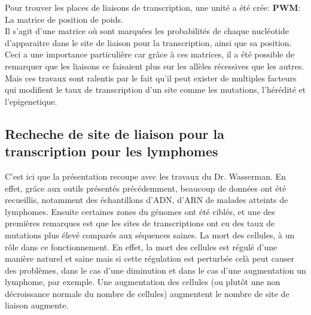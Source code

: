 Pour trouver les places de liaisons de transcription, une unité a été crée: \textbf{PWM}: La matrice de position de poids.\\
Il s'agit d'une matrice où sont marquées les probabilités de chaque nucléotide d'apparaitre dans le site de liaison pour la transcription, ainsi que sa position.
\newline
\newline
Ceci a une importance particulière car grâce à ces matrices, il a été possible de remarquer que les liaisons ce faisaient plus sur les allèles récessives que les autres.
\newline
Mais ces travaux sont ralentis par le fait qu'il peut exister de multiples facteurs qui modifient le taux de transcription d'un site comme les mutations, l'hérédité et l'epigenetique.
\subsection{Recheche de site de liaison pour la transcription pour les lymphomes}

C'est ici que la présentation recoupe avec les travaux du Dr. Wasserman.
\newline
En effet, grâce aux outils présentés précédemment, beaucoup de données ont été recueillis, notamment des échantillons d'ADN, d'ARN de malades atteints de lymphomes.
\newline
\newline
Ensuite certaines zones du génomes ont été ciblés, et une des premières remarques est que les sites de transcriptions ont eu des taux de mutations plus élevé comparés aux séquences saines.
\newline
\newline
La mort des cellules, à un rôle dans ce fonctionnement. En effet, la mort des cellules est régulé d'une manière naturel et saine mais si cette régulation est perturbée celà peut causer des problèmes, dans le cas d'une diminution et dans le cas d'une augmentation un lymphome, par exemple. Une augmentation des cellules (ou plutôt une non décroissance normale du nombre de cellules) augmentent le nombre de site de liaison augmente. 



